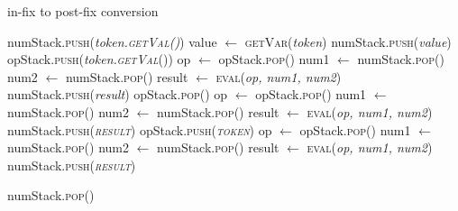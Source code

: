 \documentclass{article}
\begin{document}
	
	\begin{algorithm}
		\caption{in-fix to post-fix conversion}
		\label{shuntingYard}
		\begin{algorithmic}[1]
					\State numStack.\textsc{push}(\textit{token.\textsc{getVal()}})
					\State value $ \gets $ \textsc{getVar}(\textit{token})
					\State numStack.\textsc{push}(\textit{value})
					\State opStack.\textsc{push}(\textit{token.\textsc{getVal}}())
						\State op $ \gets $ opStack.\textsc{pop}()
						\State num1 $ \gets $ numStack.\textsc{pop}()
						\State num2 $ \gets $ numStack.\textsc{pop}()
						\State result $ \gets $ \textsc{eval}(\textit{op, num1, num2})
						\State numStack.\textsc{push}(\textit{result})
					\EndWhile
					\State opStack.\textsc{pop}()
						\State op $ \gets $ opStack.\textsc{pop}()
						\State num1 $ \gets $ numStack.\textsc{pop}()
						\State num2 $ \gets $ numStack.\textsc{pop}()
						\State result $ \gets $ \textsc{eval}(\textit{op, num1, num2})
						\State numStack.\textsc{push(\textit{result})}
					\EndWhile
					\State opStack.\textsc{push(\textit{token})}
				\EndIf
			\EndWhile
				\State op $ \gets $ opStack.\textsc{pop}()
				\State num1 $ \gets $ numStack.\textsc{pop}()
				\State num2 $ \gets $ numStack.\textsc{pop}()
				\State result $ \gets $ \textsc{eval}(\textit{op, num1, num2})
				\State numStack.\textsc{push(\textit{result})}
			\EndWhile
			
			\State \Return numStack.\textsc{pop()}
			\EndFunction
		\end{algorithmic}
	\end{algorithm}
\end{document}

